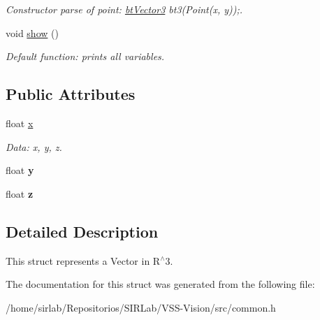 \begin{DoxyCompactItemize}
\begin{DoxyCompactList}\small\item\em Constructor parse of point\-: \hyperlink{structcommon_1_1btVector3}{bt\-Vector3} bt3(\-Point(x, y));. \end{DoxyCompactList}\item 
\hypertarget{structcommon_1_1btVector3_ad182266905d95459f9ca03da9af47f35}{void \hyperlink{structcommon_1_1btVector3_ad182266905d95459f9ca03da9af47f35}{show} ()}\label{structcommon_1_1btVector3_ad182266905d95459f9ca03da9af47f35}

\begin{DoxyCompactList}\small\item\em Default function\-: prints all variables. \end{DoxyCompactList}\end{DoxyCompactItemize}
\subsection*{Public Attributes}
\begin{DoxyCompactItemize}
\item 
\hypertarget{structcommon_1_1btVector3_adbe23ed6ae54734cbdf7b37788e0c702}{float \hyperlink{structcommon_1_1btVector3_adbe23ed6ae54734cbdf7b37788e0c702}{x}}\label{structcommon_1_1btVector3_adbe23ed6ae54734cbdf7b37788e0c702}

\begin{DoxyCompactList}\small\item\em Data\-: x, y, z. \end{DoxyCompactList}\item 
\hypertarget{structcommon_1_1btVector3_a5b52b09733d198cde3d283c0b2b320d1}{float {\bfseries y}}\label{structcommon_1_1btVector3_a5b52b09733d198cde3d283c0b2b320d1}

\item 
\hypertarget{structcommon_1_1btVector3_aa03665d96dd5d3dd2dbaeb6e9f24f4bc}{float {\bfseries z}}\label{structcommon_1_1btVector3_aa03665d96dd5d3dd2dbaeb6e9f24f4bc}

\end{DoxyCompactItemize}


\subsection{Detailed Description}
This struct represents a Vector in R$^\wedge$3. 

The documentation for this struct was generated from the following file\-:\begin{DoxyCompactItemize}
\item 
/home/sirlab/\-Repositorios/\-S\-I\-R\-Lab/\-V\-S\-S-\/\-Vision/src/common.\-h\end{DoxyCompactItemize}
